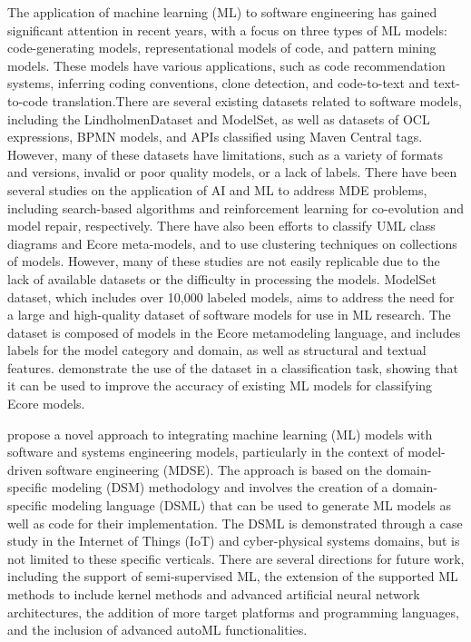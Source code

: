 The application of machine learning (ML) to software engineering has gained significant attention in recent years, with a focus on three types of ML models: code-generating models, representational models of code, and pattern mining models. These models have various applications, such as code recommendation systems, inferring coding conventions, clone detection, and code-to-text and text-to-code translation.There are several existing datasets related to software models, including the LindholmenDataset and ModelSet, as well as datasets of OCL expressions, BPMN models, and APIs classified using Maven Central tags. However, many of these datasets have limitations, such as a variety of formats and versions, invalid or poor quality models, or a lack of labels.
There have been several studies on the application of AI and ML to address MDE problems, including search-based algorithms and reinforcement learning for co-evolution and model repair, respectively. There have also been efforts to classify UML class diagrams and Ecore meta-models, and to use clustering techniques on collections of models. However, many of these studies are not easily replicable due to the lack of available datasets or the difficulty in processing the models.
ModelSet dataset, which includes over 10,000 labeled models, aims to address the need for a large and high-quality dataset of software models for use in ML research. The dataset is composed of models in the Ecore metamodeling language, and includes labels for the model category and domain, as well as structural and textual features. \cite{modelset} demonstrate the use of the dataset in a classification task, showing that it can be used to improve the accuracy of existing ML models for classifying Ecore models.


\cite{mdApproach} propose a novel approach to integrating machine learning (ML) models with software and systems engineering models, particularly in the context of model-driven software engineering (MDSE). The approach is based on the domain-specific modeling (DSM) methodology and involves the creation of a domain-specific modeling language (DSML) that can be used to generate ML models as well as code for their implementation. The DSML is demonstrated through a case study in the Internet of Things (IoT) and cyber-physical systems domains, but is not limited to these specific verticals.
There are several directions for future work, including the support of semi-supervised ML, the extension of the supported ML methods to include kernel methods and advanced artificial neural network architectures, the addition of more target platforms and programming languages, and the inclusion of advanced autoML functionalities.

